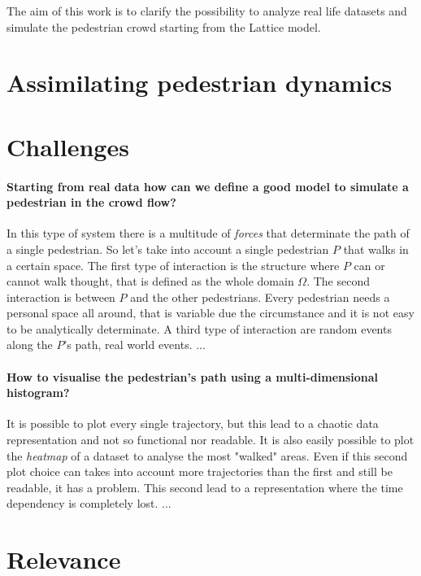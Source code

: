\documentclass[class=article, crop=false]{standalone}
\begin{document}
The aim of this work is to clarify the possibility to analyze real life datasets and simulate the pedestrian crowd starting from the Lattice model.

\section{Assimilating pedestrian dynamics}




\section{Challenges}

\paragraph{Starting from real data how can we define a good model to simulate a pedestrian in the crowd flow?}
In this type of system there is a multitude of \emph{forces} that determinate the path of a single pedestrian.
So let's take into account a single pedestrian $P$ that walks in a certain space.
The first type of interaction is the structure where $P$ can or cannot walk thought, that is defined as the whole domain $\Omega$.
The second interaction is between $P$ and the other pedestrians.
Every pedestrian needs a personal space all around, that is variable due the circumstance and it is not easy to be analytically determinate.
A third type of interaction are random events along the $P$'s path, real world events.
...

\paragraph{How to visualise the pedestrian's path using a multi-dimensional histogram?}
It is possible to plot every single trajectory, but this lead to a chaotic data representation and not so functional nor readable.
It is also easily possible to plot the \emph{heatmap} of a dataset to analyse the most "walked" areas.
Even if this second plot choice can takes into account more trajectories than the first and still be readable, it has a problem.
This second lead to a representation where the time dependency is completely lost.
...





\section{Relevance}
\end{document}
